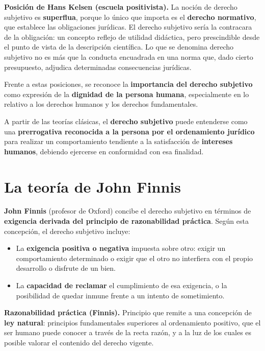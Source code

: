 \documentclass[12pt, a4paper]{report}
\begin{document}
\begin{definition}
\textbf{Posición de Hans Kelsen (escuela positivista).} La noción de derecho
subjetivo es \textbf{superflua}, porque lo único que importa es el
\textbf{derecho normativo}, que establece las obligaciones jurídicas. El derecho
subjetivo sería la contracara de la obligación: un concepto reflejo de utilidad
didáctica, pero prescindible desde el punto de vista de la descripción
científica. Lo que se denomina derecho subjetivo no es más que la conducta
encuadrada en una norma que, dado cierto presupuesto, adjudica determinadas
consecuencias jurídicas.
\end{definition}

Frente a estas posiciones, se reconoce la \textbf{importancia del derecho
subjetivo} como expresión de la \textbf{dignidad de la persona humana},
especialmente en lo relativo a los derechos humanos y los derechos fundamentales.

A partir de las teorías clásicas, el \textbf{derecho subjetivo} puede entenderse
como una \textbf{prerrogativa reconocida a la persona por el ordenamiento
jurídico} para realizar un comportamiento tendiente a la satisfacción de
\textbf{intereses humanos}, debiendo ejercerse en conformidad con esa finalidad.

\section{La teoría de John Finnis}

\textbf{John Finnis} (profesor de Oxford) concibe el derecho subjetivo en
términos de \textbf{exigencia derivada del principio de razonabilidad práctica}.
Según esta concepción, el derecho subjetivo incluye:

\begin{itemize}
  \item La \textbf{exigencia positiva o negativa} impuesta sobre otro: exigir
        un comportamiento determinado o exigir que el otro no interfiera con el
        propio desarrollo o disfrute de un bien.
  \item La \textbf{capacidad de reclamar} el cumplimiento de esa exigencia, o
        la posibilidad de quedar inmune frente a un intento de sometimiento.
\end{itemize}

\begin{definition}
\textbf{Razonabilidad práctica (Finnis).} Principio que remite a una
concepción de \textbf{ley natural}: principios fundamentales superiores al
ordenamiento positivo, que el ser humano puede conocer a través de la recta
razón, y a la luz de los cuales es posible valorar el contenido del derecho
vigente.
\end{definition}
\end{document}
